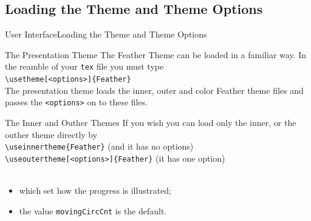 \documentclass[10pt]{beamer}
\begin{document}
\subsection{Loading the Theme and Theme Options}
\begin{frame}{User Interface}{Loading the Theme and Theme Options}

  \begin{block}{The Presentation Theme}
    The Feather Theme can be loaded in a familiar way. In the reamble of your {\tt tex} file you must type\\ \vspace{5pt} 
    {\tt \textbackslash usetheme[<options>]\{Feather\}}\\ \vspace{5pt} 
    The presentation theme loads the inner, outer and color Feather theme files and passes the {\tt <options>} on to these files.
  \end{block}
  \begin{block}{The Inner and Outher Themes}
    If you wish you can load only the inner, or the outher theme directly by\\ \vspace{5pt} 
    {\tt \textbackslash useinnertheme\{Feather\}} (and it has no options)\\ \vspace{5pt} 
    {\tt \textbackslash useoutertheme[<options>]\{Feather\}} (it has one option)\\
     \\
    \begin{itemize}
    \item which set how the progress is illustrated;
    \item the value {\tt movingCircCnt} is the default.
    \end{itemize}
  \end{block}
\end{frame}
\end{document}
